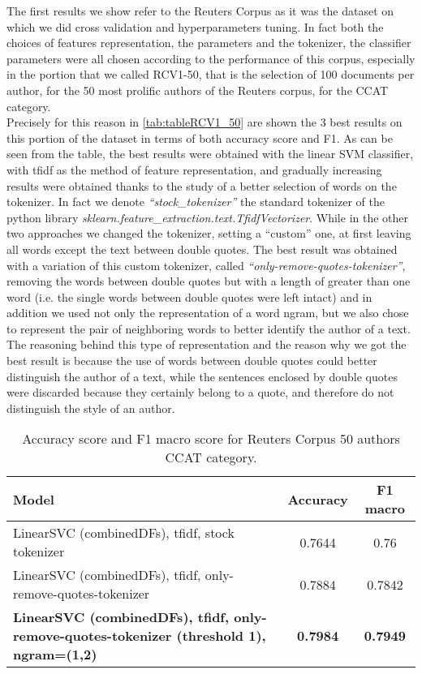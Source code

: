 The first results we show refer to the Reuters Corpus as it was the dataset on which we did cross validation and hyperparameters tuning. In fact both the choices of features representation, the parameters and the tokenizer, the classifier parameters were all chosen according to the performance of this corpus, especially in the portion that we called RCV1-50, that is the selection of 100 documents per author, for the 50 most prolific authors of the Reuters corpus, for the CCAT category.\\
Precisely for this reason in \autoref{tab:tableRCV1_50} are shown the 3 best results on this portion of the dataset in terms of both accuracy score and F1. As can be seen from the table, the best results were obtained with the linear SVM classifier, with tfidf as the method of feature representation, and gradually increasing results were obtained thanks to the study of a better selection of words on the tokenizer.
In fact we denote \textit{\enquote{stock\_tokenizer}} the standard tokenizer of the python library 
\textit{sklearn.feature\_extraction.text.TfidfVectorizer}. While in the other two approaches we changed the tokenizer, setting a \enquote{custom} one, at first leaving all words except the text between double quotes. The best result was obtained with a variation of this custom tokenizer, called \textit{\enquote{only-remove-quotes-tokenizer}}, removing the words between double quotes but with a length of greater than one word (i.e. the single words between double quotes were left intact) and in addition we used not only the representation of a word ngram, but we also chose to represent the pair of neighboring words to better identify the author of a text.
The reasoning behind this type of representation and the reason why we got the best result is because the use of words between double quotes could better distinguish the author of a text, while the sentences enclosed by double quotes were discarded because they certainly belong to a quote, and therefore do not distinguish the style of an author.


\begin{table}[h!]
	\begin{center}  
		\caption[Reuters Corpus Results - 50 authors]{Accuracy score and F1 macro score for Reuters Corpus 50 authors CCAT category.} 
		\label{tab:tableRCV1_50}
		\begin{tabular}{| p{5 cm} | c | c |}
			\hline 
			Model & Accuracy & F1 macro \\
			\hline
			LinearSVC (combinedDFs), tfidf, stock tokenizer & 0.7644 & 0.76 \\ \hline
			LinearSVC (combinedDFs), tfidf, only-remove-quotes-tokenizer & 0.7884 & 0.7842 \\ \hline
			\textbf{LinearSVC (combinedDFs), tfidf, only-remove-quotes-tokenizer (threshold 1),
			ngram=(1,2)} & \textbf{0.7984} & \textbf{0.7949} \\ \hline
		\end{tabular} 
	\end{center}
\end{table}

